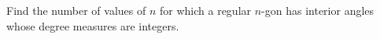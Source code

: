 Find the number of values of $n$ for which a regular $n$-gon has interior angles whose degree measures are integers.
